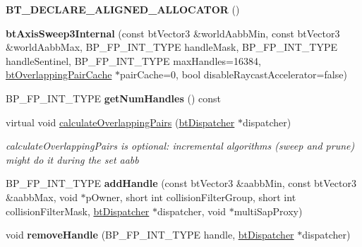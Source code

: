 \begin{DoxyCompactItemize}
{\bfseries B\+T\+\_\+\+D\+E\+C\+L\+A\+R\+E\+\_\+\+A\+L\+I\+G\+N\+E\+D\+\_\+\+A\+L\+L\+O\+C\+A\+T\+OR} ()
\item 
\mbox{\label{classbtAxisSweep3Internal_ac995b48f3a60ffac694c1d3c1e891226}} 
{\bfseries bt\+Axis\+Sweep3\+Internal} (const bt\+Vector3 \&world\+Aabb\+Min, const bt\+Vector3 \&world\+Aabb\+Max, B\+P\+\_\+\+F\+P\+\_\+\+I\+N\+T\+\_\+\+T\+Y\+PE handle\+Mask, B\+P\+\_\+\+F\+P\+\_\+\+I\+N\+T\+\_\+\+T\+Y\+PE handle\+Sentinel, B\+P\+\_\+\+F\+P\+\_\+\+I\+N\+T\+\_\+\+T\+Y\+PE max\+Handles=16384, \hyperlink{classbtOverlappingPairCache}{bt\+Overlapping\+Pair\+Cache} $\ast$pair\+Cache=0, bool disable\+Raycast\+Accelerator=false)
\item 
\mbox{\label{classbtAxisSweep3Internal_a86d2dfd94fee65d42d8c288de249681b}} 
B\+P\+\_\+\+F\+P\+\_\+\+I\+N\+T\+\_\+\+T\+Y\+PE {\bfseries get\+Num\+Handles} () const
\item 
\mbox{\label{classbtAxisSweep3Internal_a8858db666e60ef09141b0030922fbe0e}} 
virtual void \hyperlink{classbtAxisSweep3Internal_a8858db666e60ef09141b0030922fbe0e}{calculate\+Overlapping\+Pairs} (\hyperlink{classbtDispatcher}{bt\+Dispatcher} $\ast$dispatcher)
\begin{DoxyCompactList}\small\item\em calculate\+Overlapping\+Pairs is optional\+: incremental algorithms (sweep and prune) might do it during the set aabb \end{DoxyCompactList}\item 
\mbox{\label{classbtAxisSweep3Internal_ad83a70943bd46e24813b16fbc02b38d6}} 
B\+P\+\_\+\+F\+P\+\_\+\+I\+N\+T\+\_\+\+T\+Y\+PE {\bfseries add\+Handle} (const bt\+Vector3 \&aabb\+Min, const bt\+Vector3 \&aabb\+Max, void $\ast$p\+Owner, short int collision\+Filter\+Group, short int collision\+Filter\+Mask, \hyperlink{classbtDispatcher}{bt\+Dispatcher} $\ast$dispatcher, void $\ast$multi\+Sap\+Proxy)
\item 
\mbox{\label{classbtAxisSweep3Internal_a4e26f4f8acf63f26451f6396223001bb}} 
void {\bfseries remove\+Handle} (B\+P\+\_\+\+F\+P\+\_\+\+I\+N\+T\+\_\+\+T\+Y\+PE handle, \hyperlink{classbtDispatcher}{bt\+Dispatcher} $\ast$dispatcher)
\item 

\end{DoxyCompactItemize}
